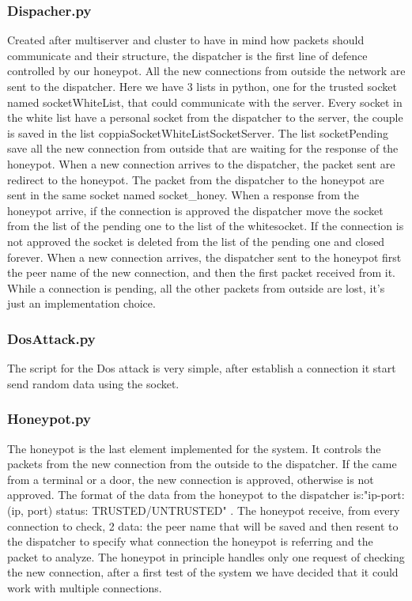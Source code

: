 \subsubsection{Dispacher.py}
Created after multiserver and cluster to have in mind how packets should communicate and their structure, the dispatcher is the first line of defence controlled by our honeypot. All the new connections from outside the network are sent to the dispatcher. Here we have 3 lists in python, one for the trusted socket named socketWhiteList, that could communicate with the server. Every socket in the white list have a personal socket from the dispatcher to the server, the couple is saved in the list coppiaSocketWhiteListSocketServer. The list socketPending save all the new connection from outside that are waiting for the response of the honeypot. When a new connection arrives to the dispatcher, the packet sent are redirect to the honeypot. The packet from the dispatcher to the honeypot are sent in the same socket named socket\_honey. When a response from the honeypot arrive, if the connection is approved the dispatcher move the socket from the list of the pending one to the list of the whitesocket. If the connection is not approved the socket is deleted from the list of the pending one and closed forever. When a new connection arrives, the dispatcher sent to the honeypot first the peer name of the new connection, and then the first packet received from it. While a connection is pending, all the other packets from outside are lost, it's just an implementation choice.

\subsubsection{DosAttack.py}
The script for the Dos attack is very simple,  after establish a connection it start send random data using the socket. 


\subsubsection{Honeypot.py}
The honeypot is the last element implemented for the system. It controls the packets from the new connection from the outside to the dispatcher. If the came from a terminal or a door, the new connection is approved, otherwise is not approved. The format of the data from the honeypot to the dispatcher is:"ip-port: (ip, port) status: TRUSTED/UNTRUSTED" . The honeypot receive, from every connection to check, 2 data: the peer name that will be saved and then resent to the dispatcher to specify what connection the honeypot is referring and the packet to analyze.
The honeypot in principle handles only one request of checking the new connection, after a first test of the system we have decided that it could work with multiple connections.


